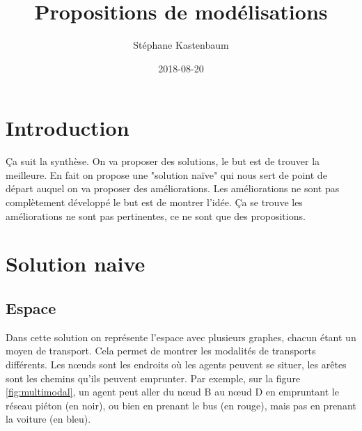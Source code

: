 \documentclass[a4paper]{article}
\title{Propositions de modélisations}
\author{Stéphane Kastenbaum}
\date{2018-08-20}
\begin{document}
\maketitle

\section{Introduction}

Ça suit la synthèse. On va proposer des solutions, le but est de trouver la
meilleure. En fait on propose une "solution naïve" qui nous sert de point de
départ auquel on va proposer des améliorations. Les améliorations ne sont pas
complètement développé le but est de montrer l'idée. Ça se trouve les
améliorations ne sont pas pertinentes, ce ne sont que des propositions.

\section{Solution naive}

  \subsection{Espace}

Dans cette solution on représente l'espace avec plusieurs graphes, chacun étant
un moyen de transport. Cela permet de montrer les modalités de transports
différents. Les nœuds sont les endroits où les agents peuvent se situer, les
arêtes sont les chemins qu'ils peuvent emprunter. Par exemple, sur la figure
\ref{fig:multimodal}, un agent peut aller du nœud B au nœud D en empruntant le
réseau piéton (en noir), ou bien en prenant le bus (en rouge), mais pas en
prenant la voiture (en bleu).
\end{document}
